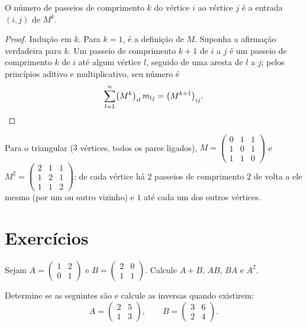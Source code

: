 \begin{theorem}\label{thm:g12:matrix:walks}
O número de passeios de comprimento $k$ do vértice $i$ ao vértice $j$ é a
entrada $(i,j)$ de $M^k$.
\end{theorem}

\begin{proof}
Indução em $k$. Para $k = 1$, é a definição de $M$. Suponha a afirmação
verdadeira para $k$. Um passeio de comprimento $k+1$ de $i$ a $j$ é um
passeio de comprimento $k$ de $i$ até algum vértice $l$, seguido de uma
aresta de $l$ a $j$; pelos princípios aditivo e multiplicativo, seu número
é
\[
\sum_{l=1}^{n} \bigl(M^k\bigr)_{il}\, m_{lj} = \bigl(M^{k+1}\bigr)_{ij}.
\qedhere
\]
\end{proof}

\begin{example}
Para o  triangular ($3$ vértices, todos os pares ligados),
$M = \begin{pmatrix} 0&1&1\\ 1&0&1\\ 1&1&0\end{pmatrix}$ e
$M^2 = \begin{pmatrix} 2&1&1\\ 1&2&1\\ 1&1&2\end{pmatrix}$: de cada
vértice há $2$ passeios de comprimento $2$ de volta a ele mesmo (por um ou
outro vizinho) e $1$ até cada um dos outros vértices.
\end{example}

\section{Exercícios}

\begin{exercise}[$\star$]\label{exo:g12:matrix:1}
Sejam $A = \begin{pmatrix} 1 & 2\\ 0 & 1 \end{pmatrix}$ e
$B = \begin{pmatrix} 2 & 0\\ 1 & 1 \end{pmatrix}$. Calcule $A + B$, $AB$,
$BA$ e $A^2$.
\end{exercise}

\begin{exercise}[$\star$]\label{exo:g12:matrix:2}
Determine se as  seguintes são  e calcule as inversas
quando existirem:
\[
A = \begin{pmatrix} 2 & 5\\ 1 & 3\end{pmatrix}, \qquad
B = \begin{pmatrix} 3 & 6\\ 2 & 4\end{pmatrix}.
\]
\end{exercise}

